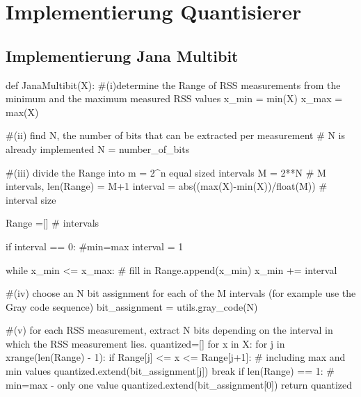 \section{Implementierung Quantisierer}


\subsection*{Implementierung Jana Multibit}
\begin{python}
	def JanaMultibit(X):
		#(i)determine the Range of RSS measurements from the minimum and the maximum measured RSS values
		x_min = min(X)
		x_max = max(X)

		#(ii) find N, the number of bits that can be extracted per measurement
		# N is already implemented
		N = number_of_bits

		#(iii) divide the Range into m = 2^n equal sized intervals
		M = 2**N	# M intervals, len(Range) = M+1
		interval = abs((max(X)-min(X))/float(M)) # interval size
		
		Range =[] 	# intervals
		
		if interval == 0:	#min=max
			interval = 1

		while x_min <= x_max:	# fill in
			Range.append(x_min) 
			x_min += interval

		#(iv) choose an N bit assignment for each of the M intervals (for example use the Gray code sequence) 
		bit_assignment = utils.gray_code(N)

		#(v) for each RSS measurement, extract N bits depending on the interval in which the RSS measurement lies. 
		quantized=[]
		for x in X:
			for j in xrange(len(Range) - 1):
				if Range[j] <= x <= Range[j+1]: # including max and min values
					quantized.extend(bit_assignment[j])
					break
			if len(Range) == 1:	# min=max - only one value
				quantized.extend(bit_assignment[0])
		return quantized
\end{python}
